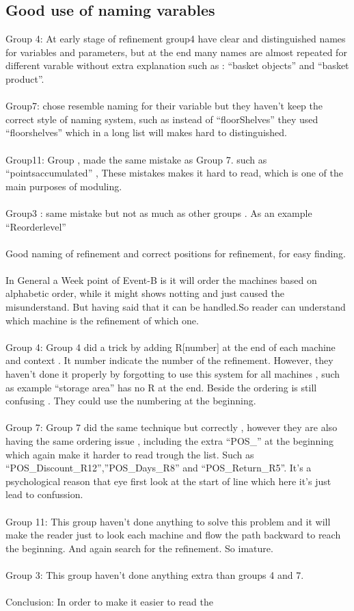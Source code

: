 \subsection{Good use of naming varables}
\label{gooduseofnamingvarables}

Group 4: At early stage of refinement group4 have clear and distinguished names for variables and parameters, but at the end many names are almost repeated for different varable without extra explanation such as : “basket objects” and “basket product”.  \\ \\  Group7: chose resemble naming for their variable but they haven't keep the correct style of naming system, such as instead of “floorShelves” they used “floorshelves” which in a long list will makes hard to distinguished.  \\ \\  Group11: Group , made the same mistake as Group 7. such as “pointsaccumulated” , These mistakes makes it hard to read, which is one of the main purposes of moduling.  \\ \\  Group3 : same mistake but not as much as other groups . As an example “Reorderlevel”  \\ \\  Good naming of refinement and correct positions for refinement, for easy finding.  \\ \\  In General a Week point of Event-B is it will order the machines based on alphabetic order, while it might shows notting and just caused the misunderstand. But having said that it can be handled.So reader can understand which machine is the refinement of which one.  \\ \\  Group 4: Group 4 did a trick by adding R[number] at the end of each machine and context . It number indicate the number of the refinement. However, they haven't done it properly by forgotting to use this system for all machines , such as example “storage area” has no R at the end. Beside the ordering is still confusing . They could use the numbering at the beginning.  \\ \\  Group 7: Group 7 did the same technique but correctly , however they are also having the same ordering issue , including the extra “POS\_” at the beginning which again make it harder to read trough the list. Such as “POS\_Discount\_R12”,”POS\_Days\_R8” and “POS\_Return\_R5”. It's a psychological reason that eye first look at the start of line which here it's just lead to confussion.  \\ \\  Group 11: This group haven't done anything to solve this problem and it will make the reader just to look each machine and flow the path backward to reach the beginning. And again search for the refinement. So imature.  \\ \\  Group 3: This group haven't done anything extra than groups 4 and 7.  \\ \\  Conclusion: In order to make it easier to read the 